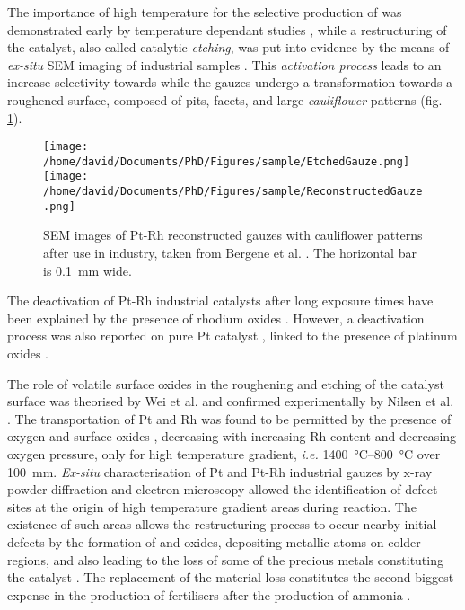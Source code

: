 The importance of high temperature for the selective production of  was demonstrated early by temperature dependant studies \parencite{Nutt1968, Pignet1974, Li1997}, while a restructuring of the catalyst, also called catalytic \textit{etching}, was put into evidence by the means of \textit{ex-situ} SEM imaging of industrial samples \parencite{McCabe1974, FlytzaniStephanopoulos1979, McCabe1986}.
This \textit{activation process} leads to an increase selectivity towards  while the gauzes undergo a transformation towards a roughened surface, composed of pits, facets, and large \textit{cauliflower} patterns (fig. \ref{fig:Gauzes}).

\begin{figure}[!htb]
    \centering
    \texttt{[image: /home/david/Documents/PhD/Figures/sample/EtchedGauze.png]}
    \texttt{[image: /home/david/Documents/PhD/Figures/sample/ReconstructedGauze.png]}
    \caption{
    SEM images of Pt-Rh reconstructed gauzes with cauliflower patterns after use in industry, taken from Bergene et al. \parencite*{Bergene1996}.
    The horizontal bar is \qty{0.1}{\mm} wide.
    }
    \label{fig:Gauzes}
\end{figure}

The deactivation of Pt-Rh industrial catalysts after long exposure times have been explained by the presence of rhodium oxides \parencite{Bergene1996}.
However, a deactivation process was also reported on pure Pt catalyst \parencite{Ostermaier1974}, linked to the presence of platinum oxides \parencite{Ostermaier1976}.

The role of volatile surface oxides in the roughening and etching of the catalyst surface was theorised by Wei et al. \parencite*{Wei1996} and confirmed experimentally by Nilsen et al. \parencite*{Nilsen2001}.
The transportation of Pt and Rh was found to be permitted by the presence of oxygen and surface oxides \parencite{Hannevold2005a}, decreasing with increasing Rh content and decreasing oxygen pressure, only for high temperature gradient, \textit{i.e.} \qtyrange{1400}{800}{\degreeCelsius} over \qty{100}{\mm}.
\textit{Ex-situ} characterisation of Pt and Pt-Rh industrial gauzes by x-ray powder diffraction and electron microscopy allowed the identification of defect sites at the origin of high temperature gradient areas during reaction.
The existence of such areas allows the restructuring process to occur nearby initial defects by the formation of  and  oxides, depositing metallic atoms on colder regions, and also leading to the loss of some of the precious metals constituting the catalyst \parencite{Hannevold2005}.
The replacement of the material loss constitutes the second biggest expense in the production of fertilisers after the production of ammonia \parencite{Hatscher2008}.

